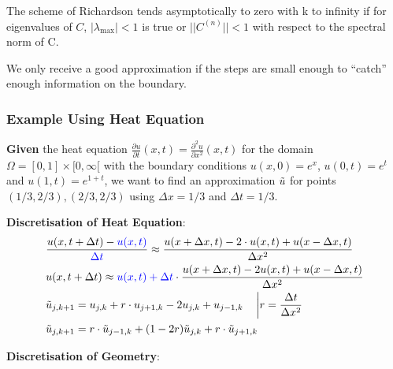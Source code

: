 The scheme of Richardson tends asymptotically to zero with k to infinity if
for eigenvalues of $C$, $|\lambda_\mathrm{max}|<1$ is true or $||C^{(n)}||<1$ with respect to the spectral norm of C.

We only receive a good approximation if the steps are small enough to ``catch'' enough information on the boundary.

\subsubsection{Example Using Heat Equation}

\textbf{Given} the heat equation $\frac{\partial u}{\partial t}(x,t) = \frac{\partial^2 u}{\partial x^2}(x,t)$
for the domain $\Omega = [0,1]\times [0, \infty[$ with the boundary conditions
$u(x,0) = e^x$, $u(0,t) = e^t$ and $u(1,t) = e^{1+t}$, we want to find an approximation $\tilde{u}$ for points
$(1/3,2/3),(2/3,2/3)$ using $\Delta x = 1/3$ and $\Delta t = 1/3$.

\textbf{Discretisation of Heat Equation}:
\begin{align*}
	& \frac{u(x,t+\Delta t)-{\color{blue} u(x,t)}}{\color{blue}\Delta t}\approx\frac{u(x+\Delta x,t)-2\cdot u(x,t)+u(x-\Delta x,t)}{\Delta x^{2}} \\
	& u(x,t+\Delta t)\approx {\color{blue}u(x,t)+\Delta t}\cdot{\frac{u(x+\Delta x,t)-2 u(x,t)+u(x-\Delta x,t)}{\Delta x^{2}}} \\
	& \tilde{u}_{j,k+1}=u_{j,k}+r\cdot u_{j+1,k} - 2u_{j,k} + u_{j-1,k}\quad \left|r=\frac{\Delta t}{\Delta x^2}\right. \\
	& \tilde{u}_{j,k+1} = r\cdot\tilde{u}_{j-1,k}+(1-2r)\tilde{u}_{j,k} + r\cdot\tilde{u}_{j+1,k}
\end{align*}

\textbf{Discretisation of Geometry}:


